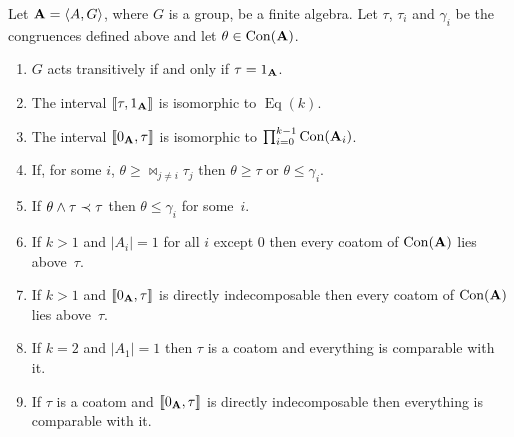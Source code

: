 \begin{theorem}\label{thm:intrans}
Let $\mathbf{A} = \langle A,G\rangle$, where $G$ is a group, be a finite algebra. 
Let $\tau$, $\tau_i$ and $\gamma_i$
be the congruences defined above and let $\theta \in \operatorname{Con}(\mathbf{A})$.
\begin{enumerate}
\item\label{item1}
$G$ acts transitively if and only if $\tau = 1_{\mathbf{A}}$.
\item \label{item2}
The interval $\llbracket\tau,1_{\mathbf{A}}\rrbracket$ is isomorphic to $\operatorname{Eq}(k)$.
\item \label{item3}
The interval $\llbracket 0_{\mathbf{A}},\tau\rrbracket$ is isomorphic to $\prod_{i=0}^{k-1} \operatorname{Con}(\mathbf{A}_i)$.
\item\label{item4}
If, for some $i$, $\theta \ge \Join_{j \ne i} \tau_j$ then $\theta \ge \tau$
or $\theta \le \gamma_i$.
\item\label{item5}
If $\theta\wedge \tau \prec \tau$  then $\theta \le \gamma_i$ for some~$i$.
\item\label{item6}
If $k>1$ and $|A_i| = 1$ for all $i$ except $0$ then every coatom of $\operatorname{Con}(\mathbf{A})$
lies above~$\tau$.
\item\label{item7}
If $k>1$ and $\llbracket 0_{\mathbf{A}},\tau\rrbracket$ is directly indecomposable 
then every coatom of $\operatorname{Con}(\mathbf{A})$ lies above~$\tau$.
\item\label{item8}
If $k = 2$ and $|A_1| = 1$ then $\tau$ is a coatom and 
everything is comparable with it.
\item\label{item9}
If $\tau$ is a coatom and $\llbracket 0_{\mathbf{A}},\tau\rrbracket$ is directly indecomposable
then everything is comparable with it.
\end{enumerate}
\end{theorem}

